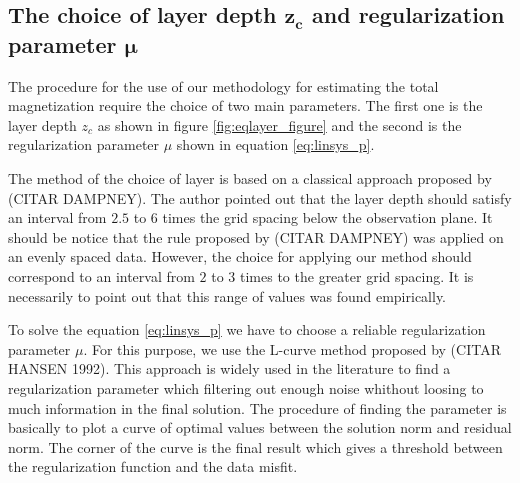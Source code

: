 %


\subsection{The choice of layer depth $\mathbf{z_c}$ and regularization parameter $\mathbf{\mu}$}

The procedure for the use of our methodology for estimating the total magnetization require the choice of two main parameters. The first one is the layer depth $z_c$ as shown in figure \ref{fig:eqlayer_figure} and the second is the regularization parameter $\mu$ shown in equation \ref{eq:linsys_p}.

The method of the choice of layer is based on a classical approach proposed by (CITAR DAMPNEY). The author pointed out that the layer depth should satisfy an interval from $2.5$ to $6$ times the grid spacing below the observation plane. It should be notice that the rule proposed by (CITAR DAMPNEY) was applied on an evenly spaced data. However, the choice for applying our method should correspond to an interval from $2$ to $3$ times to the greater grid spacing. It is necessarily to point out that this range of values was found empirically.

To solve the equation \ref{eq:linsys_p} we have to choose a reliable regularization parameter $\mu$. For this purpose, we use the L-curve method proposed by (CITAR HANSEN 1992). This approach is widely used in the literature to find a regularization parameter which filtering out enough noise whithout loosing to much information in the final solution. The procedure of finding the parameter is basically to plot a curve of optimal values between the solution norm and residual norm. The corner of the curve is the final result which gives a threshold between the regularization function and the data misfit.
